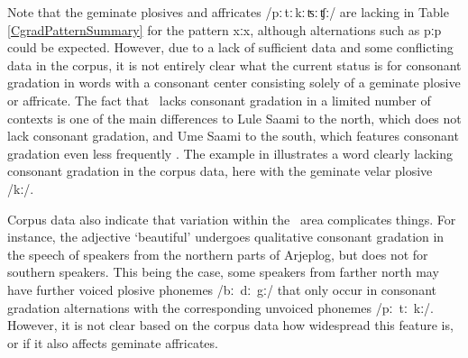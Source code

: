 Note that the geminate plosives and affricates \mbox{/pː\,tː\,kː\,ʦː\,ʧː/} are lacking in Table \vref{CgradPatternSummary} for the pattern \mbox{xː\Div x}, although alternations such as \mbox{pː\Div p} could be expected. However, due to a lack of sufficient data and some conflicting data in the corpus, it is not entirely clear what the current status is for consonant gradation in words with a consonant center consisting solely of a geminate plosive or affricate. The fact that \PS\ lacks consonant gradation in a limited number of contexts is one of the main differences to Lule Saami to the north, which does not lack consonant gradation, and Ume Saami to the south, which features consonant gradation even less frequently \citep[cf.][21-23]{Sammallahti1998}. 
The example in  illustrates a word clearly lacking consonant gradation in the corpus data, here with the geminate velar plosive /kː/. 
\ea\label{CgradEx4a}%
\z

Corpus data also indicate that variation within the \PS\ area complicates things. For instance, the adjective  ‘beautiful’ undergoes qualitative consonant gradation in the speech of speakers from the northern parts of Arjeplog, but does not for southern speakers. 
\ea\label{CgradEx4b}%
\z
This being the case, some speakers from farther north may have further voiced plosive phonemes \mbox{/bː dː gː/} that only occur in consonant gradation alternations with the corresponding unvoiced phonemes \mbox{/pː tː kː/}. However, it is not clear based on the corpus data how widespread this feature is, or if it also affects geminate affricates. 

